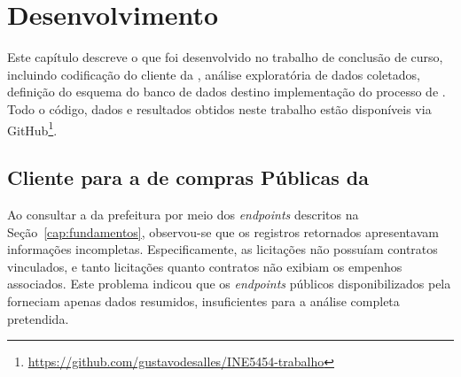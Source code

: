 \documentclass[
	12pt,				%
	oneside,			%
	a4paper,			%
	chapter=TITLE,		%
	section=TITLE,		%
	english,			%
	brazil				%
	]{abntex2}
\begin{document}

\chapter{Desenvolvimento}
\label{cap:Desenvolvimento}

Este capítulo descreve o que foi desenvolvido no trabalho de conclusão de curso, incluindo codificação do cliente da , análise exploratória de dados coletados, definição do esquema do banco de dados destino implementação do processo de . 
Todo o código, dados e resultados obtidos neste trabalho estão disponíveis via GitHub\footnote{\url{https://github.com/gustavodesalles/INE5454-trabalho}}.

\section{Cliente para a  de compras Públicas da }

Ao consultar a  da prefeitura por meio dos \textit{endpoints} descritos na Seção~\ref{cap:fundamentos}, observou-se que os registros retornados apresentavam informações incompletas. Especificamente, as licitações não possuíam contratos vinculados, e tanto licitações quanto contratos não exibiam os empenhos associados. Este problema indicou que os \textit{endpoints} públicos disponibilizados pela  forneciam apenas dados resumidos, insuficientes para a análise completa pretendida.
\end{document}
